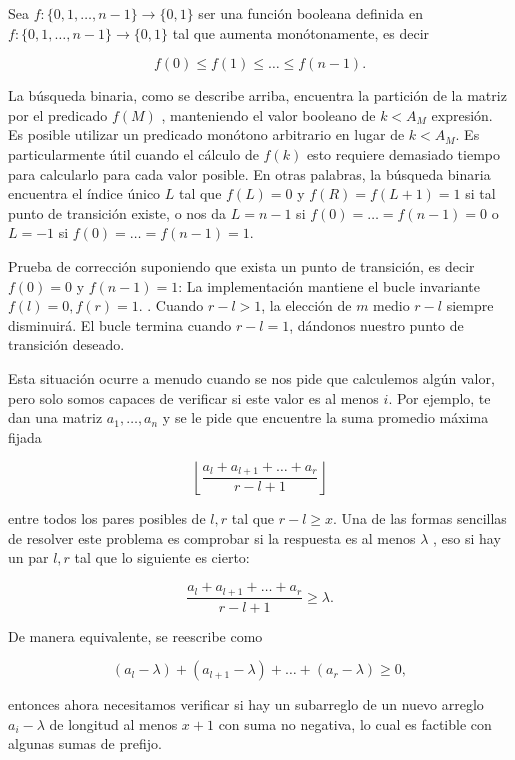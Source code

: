 Sea $f : \{0,1,\dots, n-1\} \to \{0, 1\}$  ser una función booleana definida en $f : \{0,1,\dots, n-1\} \to \{0, 1\}$  tal que aumenta monótonamente, es decir

$$ f(0) \leq f(1) \leq \dots \leq f(n-1). $$

La búsqueda binaria, como se describe arriba, encuentra la partición de la matriz por el predicado $f(M)$ , manteniendo el valor booleano de $k < A_M$  expresión. Es posible utilizar un predicado monótono arbitrario en lugar de $k < A_M$. Es particularmente útil cuando el cálculo de $f(k)$ esto requiere demasiado tiempo para calcularlo para cada valor posible. En otras palabras, la búsqueda binaria encuentra el índice único $L$ tal que $f(L) = 0$ y
$f(R)=f(L+1)=1$ si tal punto de transición existe, o nos da $L = n-1$ si $f(0) = \dots = f(n-1) = 0$ o $L = -1$  si $f(0) = \dots = f(n-1) = 1$.

Prueba de corrección suponiendo que exista un punto de transición, es decir $f(0)=0$ y $f(n-1)=1$: La implementación mantiene el bucle invariante $f(l)=0, f(r)=1$. . Cuando $r - l > 1$, la elección de $m$ medio $r-l$ siempre disminuirá. El bucle termina cuando $r - l = 1$, dándonos nuestro punto de transición deseado.

Esta situación ocurre a menudo cuando se nos pide que calculemos algún valor, pero solo somos capaces de verificar si este valor es al menos $i$. Por ejemplo, te dan una matriz $a_1,\dots,a_n$ y se le pide que encuentre la suma promedio máxima fijada

$$ \left \lfloor \frac{a_l + a_{l+1} + \dots + a_r}{r-l+1} \right\rfloor $$

entre todos los pares posibles de $l,r$ tal que $r-l \geq x$. Una de las formas sencillas de resolver este problema es comprobar si la respuesta es al menos $\lambda$ , eso si hay un par $l, r$  tal que lo siguiente es cierto:

$$ \frac{a_l + a_{l+1} + \dots + a_r}{r-l+1} \geq \lambda. $$

De manera equivalente, se reescribe como

$$ (a_l - \lambda) + (a_{l+1} - \lambda) + \dots + (a_r - \lambda) \geq 0, $$

entonces ahora necesitamos verificar si hay un subarreglo de un nuevo arreglo $a_i - \lambda$ de longitud al menos $x+1$ con suma no negativa, lo cual es factible con algunas sumas de prefijo.